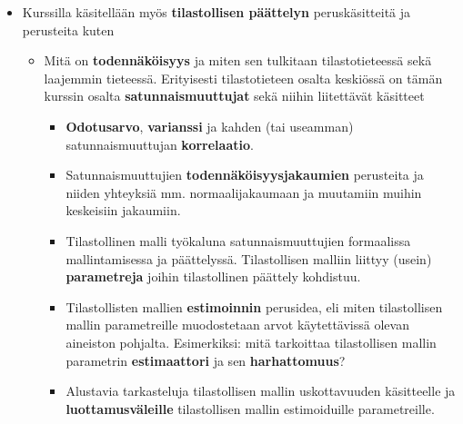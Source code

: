 \documentclass[
]{book}
\providecommand{\tightlist}{%
  \setlength{\itemsep}{0pt}\setlength{\parskip}{0pt}}
\begin{document}
\vspace{0.75cm}

\begin{itemize}
\tightlist
\item
  Kurssilla käsitellään myös \textbf{tilastollisen päättelyn} peruskäsitteitä ja perusteita kuten

  \begin{itemize}
  \tightlist
  \item
    Mitä on \textbf{todennäköisyys} ja miten sen tulkitaan tilastotieteessä sekä laajemmin tieteessä. Erityisesti tilastotieteen osalta keskiössä on tämän kurssin osalta \textbf{satunnaismuuttujat} sekä niihin liitettävät käsitteet

    \begin{itemize}
    \tightlist
    \item
      \textbf{Odotusarvo}, \textbf{varianssi} ja kahden (tai useamman) satunnaismuuttujan \textbf{korrelaatio}.
    \item
      Satunnaismuuttujien \textbf{todennäköisyysjakaumien} perusteita ja niiden yhteyksiä mm. normaalijakaumaan ja muutamiin muihin keskeisiin jakaumiin.
    \item
      Tilastollinen malli työkaluna satunnaismuuttujien formaalissa mallintamisessa ja päättelyssä. Tilastollisen malliin liittyy (usein) \textbf{parametreja} joihin tilastollinen päättely kohdistuu.
    \item
      Tilastollisten mallien \textbf{estimoinnin} perusidea, eli miten tilastollisen mallin parametreille muodostetaan arvot käytettävissä olevan aineiston pohjalta. Esimerkiksi: mitä tarkoittaa tilastollisen mallin parametrin \textbf{estimaattori} ja sen \textbf{harhattomuus}?
    \item
      Alustavia tarkasteluja tilastollisen mallin uskottavuuden käsitteelle ja \textbf{luottamusväleille} tilastollisen mallin estimoiduille parametreille.
    \end{itemize}
  \end{itemize}
\end{itemize}

\vspace{0.75cm}
\end{document}
